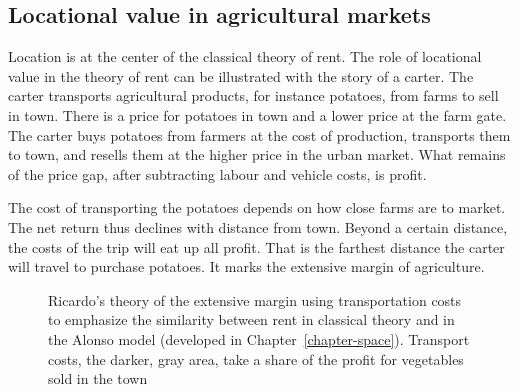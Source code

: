 
\subsection{Locational value in agricultural markets}
Location is at the center of the classical theory of rent. The role of locational value in the theory of \gls{rent} can be illustrated with the story of a carter. The carter transports agricultural products, for instance potatoes, from farms to sell in town. %
There is a price for potatoes in town and a lower price at the farm gate. The carter buys potatoes from farmers at the cost of production, transports them to town, and resells them at the higher price in the urban market. What remains of the price gap, after subtracting labour and vehicle costs, is profit. %

The cost of transporting the potatoes depends on how close farms are to market.  
The net return thus declines with distance from town. Beyond a certain distance, the costs of the trip will eat up all profit. That is the farthest distance the carter will travel to purchase potatoes. It marks the \gls{extensive margin} of agriculture. 

\begin{figure}[htb]
\begin{center}

\caption[Ricardo's theory of extensive margin.]{Ricardo's theory of the extensive margin using transportation costs to emphasize the similarity between rent in classical theory and in the Alonso model (developed in  Chapter~\ref{chapter-space}). Transport costs, the darker, gray area, take a share of the profit for vegetables sold in the town}
\label{fig-rent-ricardo}
\end{center}
\end{figure}


